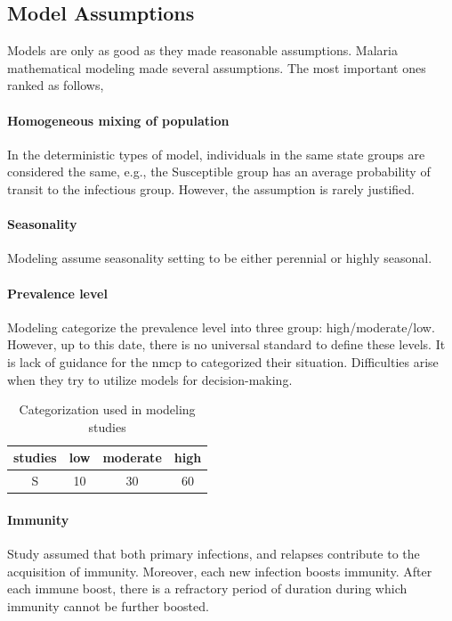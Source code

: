\documentclass[a4paper, 12pt, twoside]{article}
\begin{document}
\subsection{Model Assumptions}
Models are only as good as they made reasonable assumptions.
Malaria mathematical modeling made several assumptions.
The most important ones ranked as follows,

\paragraph{Homogeneous mixing of population}%
\label{par:homogeneous_mixing_of_population}
In the deterministic types of model, individuals in the same state groups are considered the same, e.g., the Susceptible group has an average probability of transit to the infectious group.
However, the assumption is rarely justified.

\paragraph{Seasonality}%
\label{par:seasonality}
Modeling assume seasonality setting to be either perennial or highly seasonal.

\paragraph{Prevalence level}
Modeling categorize the prevalence level into three group: high/moderate/low.
However, up to this date, there is no universal standard to define these levels.
It is lack of guidance for the \gls{nmcp} to categorized their situation.
Difficulties arise when they try to utilize models for decision-making.

\begin{table}
	\centering
	\begin{tabular}{c S S S}
		\toprule
		studies & {low} & {moderate} & {high} \\
		\midrule
		S       & 10    & 30         & 60     \\
		\bottomrule
	\end{tabular}
	\caption{Categorization used in modeling studies}
\end{table}

\paragraph{Immunity}%
\label{par:immunity}
Study\cite{White2018b} assumed that both primary infections, and relapses contribute to the acquisition of immunity.
Moreover, each new infection boosts immunity.
After each immune boost, there is a refractory period of duration during which immunity cannot be further boosted.
\end{document}
